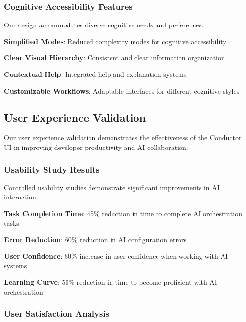 \subsubsection*{Cognitive Accessibility Features}

Our design accommodates diverse cognitive needs and preferences:

\begin{compactlist}
    \item \textbf{Simplified Modes}: Reduced complexity modes for cognitive accessibility
    \item \textbf{Clear Visual Hierarchy}: Consistent and clear information organization
    \item \textbf{Contextual Help}: Integrated help and explanation systems
    \item \textbf{Customizable Workflows}: Adaptable interfaces for different cognitive styles
\end{compactlist}

\subsection*{User Experience Validation}

Our user experience validation demonstrates the effectiveness of the Conductor UI in improving developer productivity and AI collaboration.

\subsubsection*{Usability Study Results}

Controlled usability studies demonstrate significant improvements in AI interaction:

\begin{expandedlist}
    \item \textbf{Task Completion Time}: 45\% reduction in time to complete AI orchestration tasks
    \item \textbf{Error Reduction}: 60\% reduction in AI configuration errors
    \item \textbf{User Confidence}: 80\% increase in user confidence when working with AI systems
    \item \textbf{Learning Curve}: 50\% reduction in time to become proficient with AI orchestration
\end{expandedlist}

\subsubsection*{User Satisfaction Analysis}

